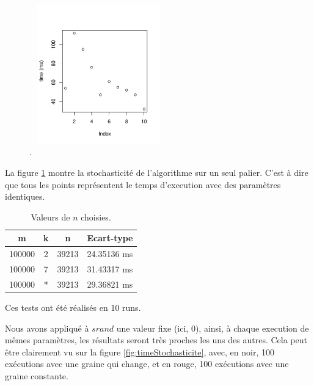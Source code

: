 \begin{figure}[htbp]
	\begin{center}
		\includegraphics[width=6cm,height=6cm]{diagrams/time_m_100000_k_2_n_39213.pdf}
		\caption{.}
		\label{fig:timeM100000K2n39213}
	\end{center}
\end{figure}
La figure \ref{fig:timeM100000K2n39213} montre la stochasticité de l'algorithme sur un seul palier. C'est à dire que tous les points représentent le temps d'execution avec des paramètres identiques.



\begin{table}[h!]
	\centering
	\caption{Valeurs de $n$ choisies.}
	\label{tab:ecartTypesTemps}
	\begin{tabular}{ccc|c}
		\toprule
		m & k & n & Ecart-type\\
		\midrule
		100000 & 2 & 39213 & 24.35136 ms\\
		100000 & 7 & 39213 & 31.43317 ms\\
		100000 & * & 39213 & 29.36821 ms\\
		\bottomrule
	\end{tabular}
\end{table}


Ces tests ont été réalisés en 10 runs.




Nous avons appliqué à $srand$ une valeur fixe (ici, 0), ainsi, à chaque execution de mêmes paramètres, les résultats seront très proches les uns des autres. Cela peut être clairement vu sur la figure \ref{fig:timeStochasticite}, avec, en noir, 100 exécutions avec une graine qui change, et en rouge, 100 exécutions avec une graine constante.

